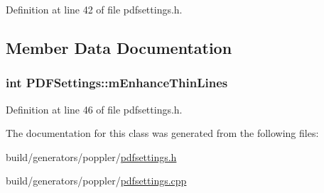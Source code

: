 Definition at line 42 of file pdfsettings.\+h.



\subsection{Member Data Documentation}
\hypertarget{classPDFSettings_a5cceb7e3f41e0ea38652daef5eec0a4f}{
\subsubsection[{m\+Enhance\+Thin\+Lines}]{\setlength{\rightskip}{0pt plus 5cm}int P\+D\+F\+Settings\+::m\+Enhance\+Thin\+Lines\hspace{0.3cm}{\ttfamily [protected]}}}\label{classPDFSettings_a5cceb7e3f41e0ea38652daef5eec0a4f}


Definition at line 46 of file pdfsettings.\+h.



The documentation for this class was generated from the following files\+:\begin{DoxyCompactItemize}
\item 
build/generators/poppler/\hyperlink{pdfsettings_8h}{pdfsettings.\+h}\item 
build/generators/poppler/\hyperlink{pdfsettings_8cpp}{pdfsettings.\+cpp}\end{DoxyCompactItemize}
